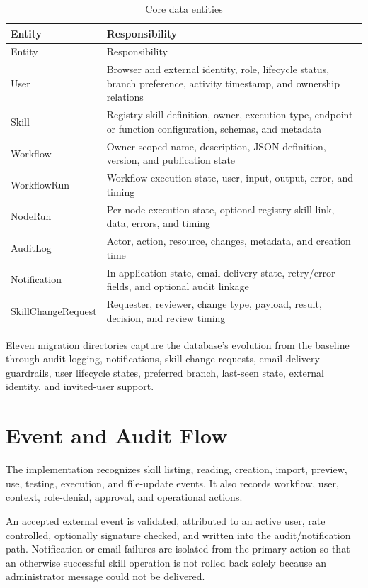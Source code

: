 \documentclass[12pt]{report}
\begin{document}
\begin{longtable}{p{}p{}}
\caption{Core data entities}\label{tab:data-model}\\
\toprule
Entity & Responsibility \\
\midrule
\endfirsthead
\toprule
Entity & Responsibility \\
\midrule
\endhead
User & Browser and external identity, role, lifecycle status, branch preference, activity timestamp, and ownership relations \\
Skill & Registry skill definition, owner, execution type, endpoint or function configuration, schemas, and metadata \\
Workflow & Owner-scoped name, description, JSON definition, version, and publication state \\
WorkflowRun & Workflow execution state, user, input, output, error, and timing \\
NodeRun & Per-node execution state, optional registry-skill link, data, errors, and timing \\
AuditLog & Actor, action, resource, changes, metadata, and creation time \\
Notification & In-application state, email delivery state, retry/error fields, and optional audit linkage \\
SkillChangeRequest & Requester, reviewer, change type, payload, result, decision, and review timing \\
\bottomrule
\end{longtable}

Eleven migration directories capture the database's evolution from the baseline through audit logging, notifications, skill-change requests, email-delivery guardrails, user lifecycle states, preferred branch, last-seen state, external identity, and invited-user support.

\section{Event and Audit Flow}

The implementation recognizes skill listing, reading, creation, import, preview, use, testing, execution, and file-update events. It also records workflow, user, context, role-denial, approval, and operational actions.

An accepted external event is validated, attributed to an active user, rate controlled, optionally signature checked, and written into the audit/notification path. Notification or email failures are isolated from the primary action so that an otherwise successful skill operation is not rolled back solely because an administrator message could not be delivered.
\end{document}

